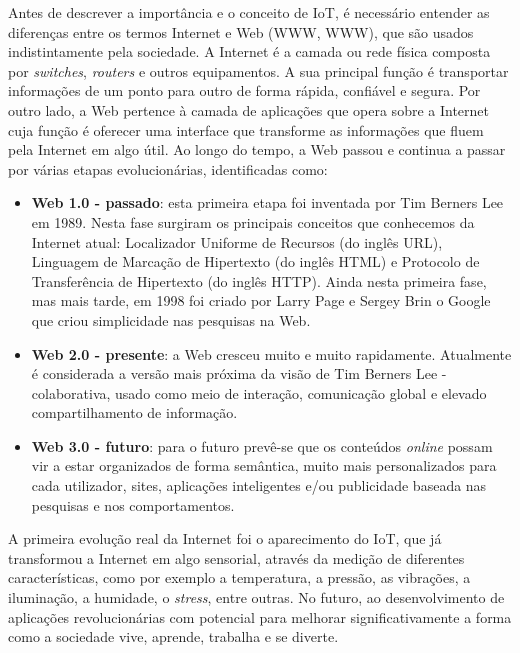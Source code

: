Antes de descrever a importância e o conceito de \ac{IoT}, é necessário entender as diferenças entre os termos Internet e Web (\acl{WWW}, \acs{WWW}), que 	são usados indistintamente pela sociedade. A Internet é a camada ou rede física composta por \textit{switches}, \textit{routers} e outros equipamentos\cite{Evans2011a}. A sua principal função é transportar informações de um ponto para outro de forma rápida, confiável e segura. Por outro lado, a Web pertence à camada de aplicações que opera sobre a Internet cuja função é oferecer uma interface que transforme as informações que fluem pela Internet em algo útil. Ao longo do tempo, a Web passou e continua a passar por várias etapas evolucionárias, identificadas como:

\begin{itemize}
	\item \textbf{Web 1.0 - passado}: esta primeira etapa foi inventada por Tim Berners Lee em 1989\cite{Getting}. Nesta fase surgiram os principais conceitos que conhecemos da Internet atual: Localizador Uniforme de Recursos (do inglês \ac{URL}), Linguagem de Marcação de Hipertexto (do inglês \ac{HTML}) e Protocolo de Transferência de Hipertexto (do inglês \ac{HTTP}). Ainda nesta primeira fase, mas mais tarde, em 1998 foi criado por Larry Page e Sergey Brin o Google que criou simplicidade nas pesquisas na Web\cite{Lovato2014}. 
	
	\item \textbf{Web 2.0 - presente}: a Web cresceu muito e muito rapidamente. Atualmente é considerada a versão mais próxima da visão de Tim Berners Lee - colaborativa, usado como meio de interação, comunicação global e elevado compartilhamento de informação. 
	
	\item \textbf{Web 3.0 - futuro}: para o futuro prevê-se que os conteúdos \textit{online} possam vir a estar organizados de forma semântica, muito mais personalizados para cada utilizador, sites, aplicações inteligentes e/ou publicidade baseada nas pesquisas e nos comportamentos.
\end{itemize}

A  primeira evolução real da Internet foi o aparecimento do \ac{IoT}, que já transformou a Internet em algo sensorial, através da medição de diferentes características, como por exemplo a temperatura, a pressão, as vibrações, a iluminação, a humidade, o \textit{stress}, entre outras. No futuro, ao desenvolvimento de aplicações revolucionárias com potencial para melhorar significativamente a forma como a sociedade vive, aprende, trabalha e se diverte. 

